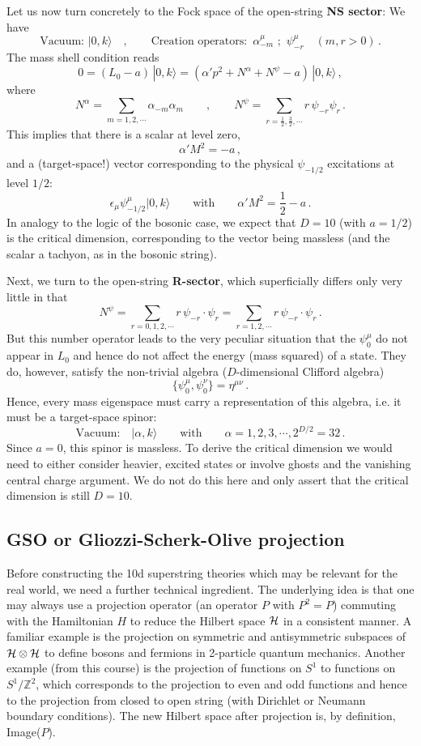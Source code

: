 \documentclass[12pt]{article}
\newcommand{\be}{\begin{equation}}
\newcommand{\ee}{\end{equation}}
\numberwithin{equation}{section}
\begin{document}
Let us now turn concretely to the Fock space of the open-string {\bf NS sector}: We have
\be
\mbox{Vacuum:}\,\,|0,k\rangle\quad,\qquad\mbox{Creation operators:}\,\,\,
\alpha_{-m}^\mu\,\,;\,\,\psi_{-r}^\mu\,\,\,\,\,\,(m,r>0)\,.
\ee
The mass shell condition reads
\be
0=(L_0-a)\,|0,k\rangle = (\alpha'p^2+N^\alpha+N^\psi-a)\,|0,k\rangle\,,
\ee
where
\be
N^\alpha=\sum_{m=1,2,\cdots}\alpha_{-m}\alpha_m\qquad,\qquad 
N^\psi=\sum_{r=\frac{1}{2},\frac{3}{2},\cdots}r\,\psi_{-r}\psi_r\,.
\ee
This implies that there is a scalar at level zero,
\be
\alpha' M^2=-a\,,
\ee
and a (target-space!) vector corresponding to the physical $\psi_{-1/2}$ excitations at level $1/2$:
\be
\epsilon_\mu\psi^\mu_{-1/2}|0,k\rangle\qquad\mbox{with}\qquad
\alpha' M^2= \frac{1}{2}-a\,.
\ee
In analogy to the logic of the bosonic case, we expect that $D=10$ (with $a=1/2$) is the critical dimension, corresponding to the vector being massless (and the scalar a tachyon, as in the bosonic string).

Next, we turn to the open-string {\bf R-sector}, which superficially differs only very little in that
\be
N^\psi=\sum_{r=0,1,2,\cdots}r\,\psi_{-r}\cdot\psi_r=\sum_{r=1,2,\cdots} r\,\psi_{-r}\cdot\psi_r\,.
\ee
But this number operator leads to the very peculiar situation that the $\psi_0^\mu$ do not appear in $L_0$ and hence do not affect the energy (mass squared) of a state. They do, however, satisfy the non-trivial algebra ($D$-dimensional Clifford algebra) 
\be
\{\psi_0^\mu,\psi_0^\nu\}=\eta^{\mu\nu}\,.
\ee
Hence, every mass eigenspace must carry a representation of this algebra, i.e. it must be a target-space spinor:
\be
\mbox{Vacuum:}\,\,\,\,\,\,|\alpha,k\rangle\qquad \mbox{with} \qquad
\alpha= 1,2,3,\cdots, 2^{D/2}=32\,.
\ee 
Since $a=0$, this spinor is massless. To derive the critical dimension we would need to either consider heavier, excited states or involve ghosts and the vanishing central charge argument. We do not do this here and only assert that the critical dimension is still $D=10$. 






\subsection{GSO or Gliozzi-Scherk-Olive projection}

Before constructing the 10d superstring theories which may be relevant for the real world, we need a further technical ingredient. The underlying idea is that one may always use a projection operator (an operator $P$ with $P^2=P$) commuting with the Hamiltonian $H$ to reduce the Hilbert space ${\cal H}$ in a consistent manner. A familiar example is the projection on symmetric and antisymmetric subspaces of ${\cal H}\otimes {\cal H}$ to define bosons and fermions in 2-particle quantum mechanics. Another example (from this course) is the projection of functions on $S^1$ to functions on $S^1/\mathbb{Z}^2$, which corresponds to the projection to even and odd functions and hence to the projection from closed to open string (with Dirichlet or Neumann boundary conditions). The new Hilbert space after projection is, by definition, Image($P$). 
\end{document}
